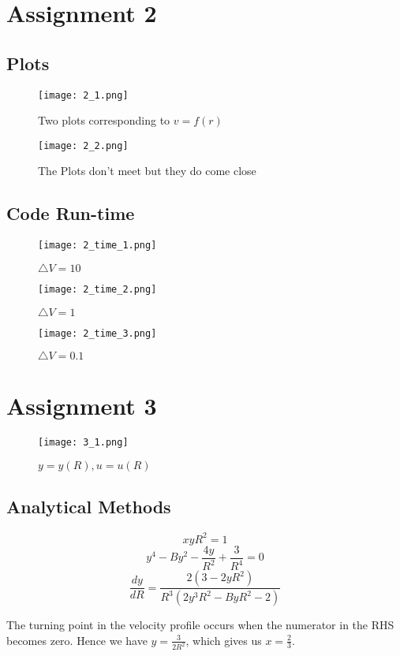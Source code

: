 \documentclass{article}
\begin{document}
\section{Assignment 2}
\subsection{Plots}
\begin{figure}[!h]
    \centering
    \texttt{[image: 2\_1.png]}
    \caption{Two plots corresponding to $v = f(r)$}
\end{figure}
\begin{figure}[!h]
    \centering
    \texttt{[image: 2\_2.png]}
    \caption{The Plots don't meet but they do come close}
\end{figure}

\newpage
\subsection{Code Run-time}
\begin{figure}[!h]
    \centering
    \texttt{[image: 2\_time\_1.png]}
    \caption{$\triangle V = 10$}
\end{figure}
\begin{figure}[!h]
    \centering
    \texttt{[image: 2\_time\_2.png]}
    \caption{$\triangle V = 1$}
\end{figure}
\begin{figure}[!h]
    \centering
    \texttt{[image: 2\_time\_3.png]}
    \caption{$\triangle V = 0.1$}
\end{figure}    
\newpage

\section{Assignment 3}
\begin{figure}[!h]
    \centering
    \texttt{[image: 3\_1.png]}
    \caption{$y = y(R), u = u(R)$}
\end{figure}
\subsection{Analytical Methods}
$$xyR^2 = 1$$
$$y^4 - By^2 - \frac{4y}{R^2} + \frac{3}{R^4} = 0$$
$$\frac{dy}{dR} = \frac{2(3 - 2yR^2)}{R^3(2y^3R^2 - ByR^2-2)}$$
\par The turning point in the velocity profile occurs when the
numerator in the RHS becomes zero. Hence we have $y = \frac{3}{2R^2}$, which gives us $x = \frac{2}{3}$.
\end{document}
